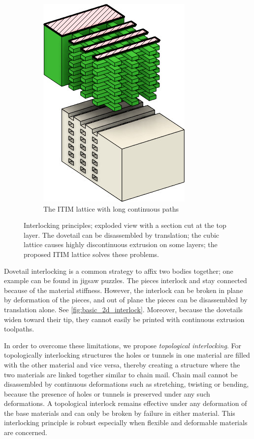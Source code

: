\begin{figure}
\begin{subfigure}[B]{.36\columnwidth}
		\includegraphics[height=\figheight]{sources-method-basic_lattice.jpg}
		\caption{The ITIM lattice with long continuous paths}
		\label{fig:basic_structure_single_mat}
	\end{subfigure}
	\caption{Interlocking principles; exploded view with a section cut at the top layer. The dovetail can be disassembled by translation; the cubic lattice causes highly discontinuous extrusion on some layers; the proposed ITIM lattice solves these problems.}
	\label{fig:basic_structure}
\end{figure}





Dovetail interlocking is a common strategy to affix two bodies together;
one example can be found in jigsaw puzzles.
The pieces interlock and stay connected because of the material stiffness.
However, the interlock can be broken in plane by deformation of the pieces,
and out of plane the pieces can be disassembled by translation alone.
See \cref{fig:basic_2d_interlock}.
Moreover, because the dovetails widen toward their tip, they cannot easily be printed with continuous extrusion toolpaths.

In order to overcome these limitations, we propose \emph{topological interlocking}.
For topologically interlocking structures the holes or tunnels in one material are filled with the other material and vice versa,
thereby creating a structure where the two materials are linked together similar to chain mail.
Chain mail cannot be disassembled by continuous deformations such as stretching, twisting or bending,
because the presence of holes or tunnels is preserved under any such deformations.
A topological interlock remains effective under any deformation of the base materials and can only be broken by failure in either material.
This interlocking principle is robust especially when flexible and deformable materials are concerned.

